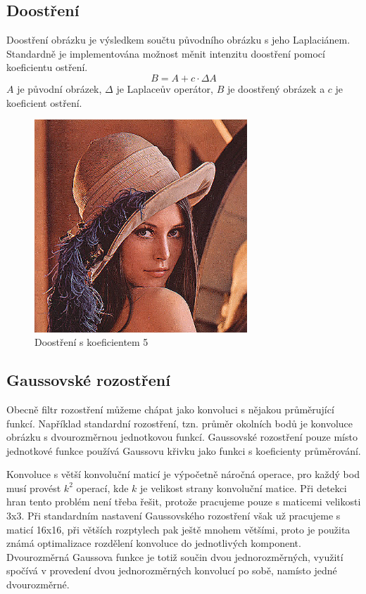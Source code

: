 \documentclass[11pt]{article}
\begin{document}
\subsection{Doostření}
Doostření obrázku je výsledkem součtu původního obrázku s jeho Laplaciánem.
Standardně je implementována možnost měnit intenzitu doostření pomocí
koeficientu ostření. \\

$$
B = A + c \cdot \Delta A
$$
$A$ je původní obrázek, $\Delta$ je Laplaceův operátor, $B$ je doostřený
obrázek a $c$ je koeficient ostření.

\begin{figure}[ht!]
\centering
	\includegraphics[width=8cm]{sharpen.png}
	\caption{Doostření s koeficientem 5}
\end{figure}


\subsection{Gaussovské rozostření}
Obecně filtr rozostření můžeme chápat jako konvoluci s nějakou průměrující
funkcí. Například standardní rozostření, tzn. průměr okolních bodů je konvoluce
obrázku s dvourozměrnou jednotkovou funkcí. Gaussovské rozostření pouze místo
jednotkové funkce používá Gaussovu křivku jako funkci s koeficienty
průměrování.  

Konvoluce s větší konvoluční maticí je výpočetně náročná operace,
pro každý bod musí provést $k^2$ operací, kde $k$ je velikost strany konvoluční
matice. Při detekci hran tento problém není třeba řešit, protože pracujeme
pouze s maticemi velikosti 3x3. Při standardním nastavení Gaussovského
rozostření však už pracujeme s maticí 16x16, při větších rozptylech pak ještě
mnohem většími, proto je použita známá optimalizace rozdělení konvoluce do
jednotlivých komponent. Dvourozměrná Gaussova funkce je totiž součin dvou
jednorozměrných, využití spočívá v provedení dvou jednorozměrných konvolucí po
sobě, namísto jedné dvourozměrné.
\end{document}
